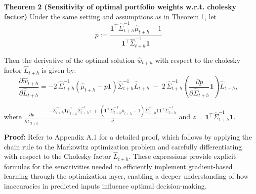 \textbf{Theorem 2 (Sensitivity of optimal portfolio weights w.r.t. cholesky factor)}
Under the same setting and assumptions as in Theorem 1, let
\begin{equation}
    p := \frac{\mathbf{1}^{\top}\hat{\Sigma}_{t+h}^{-1}\hat{\mu}_{t+h} - 1}{\mathbf{1}^{\top}\hat{\Sigma}_{t+h}^{-1}\mathbf{1}}
\end{equation}

Then the derivative of the optimal solution $\hat{w}_{t+h}$ with respect to the cholesky factor $\hat{L}_{t+h}$ is given by:
\begin{equation}
    \frac{\partial \hat{w}_{t+h}}{\partial \hat{L}_{t+h}} = -2\, \hat{\Sigma}_{t+h}^{-1}(\hat{\mu}_{t+h} - p\mathbf{1})\hat{\Sigma}_{t+h}^{-1}\hat{L}_{t+h} \;-\; 2\, \hat{\Sigma}_{t+h}^{-1}\left( \frac{\partial p}{\partial \hat{\Sigma}_{t+h}}\mathbf{1} \right)\hat{L}_{t+h},
\end{equation}

where $\frac{\partial p}{\partial \hat{\Sigma}_{t+h}} = \frac{- \hat{\Sigma}_{t+h}^{-1}\mathbf{1}\hat{\mu}_{t+h}^{\top}\hat{\Sigma}_{t+h}^{-1} z \;+\; (\mathbf{1}^{\top}\hat{\Sigma}_{t+h}^{-1}\hat{\mu}_{t+h} - 1)\hat{\Sigma}_{t+h}^{-1}\mathbf{1}\mathbf{1}^{\top}\hat{\Sigma}_{t+h}^{-1}}{z^{2}}
$ and $z = \mathbf{1}^{\top}\hat{\Sigma}_{t+h}^{-1}\mathbf{1}.$


\textbf{Proof: } Refer to Appendix A.1 for a detailed proof, which follows by applying the chain rule to the Markowitz optimization problem and carefully differentiating with respect to the Cholesky factor $\hat{L}_{t+h}$. These expressions provide explicit formulas for the sensitivities needed to efficiently implement gradient-based learning through the optimization layer, enabling a deeper understanding of how inaccuracies in predicted inputs influence optimal decision-making.


